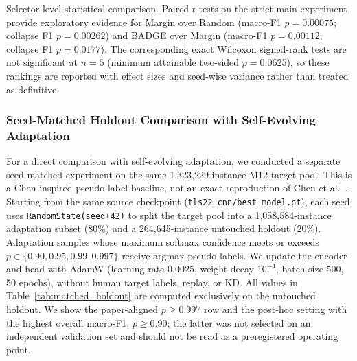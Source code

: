 \documentclass[journal]{IEEEtran}
\begin{document}
Selector-level statistical comparison.
\label{sec:significance}
Paired $t$-tests on the strict main experiment provide exploratory evidence for Margin over Random (macro-F1 $p{=}0.00075$; collapse F1 $p{=}0.00262$) and BADGE over Margin (macro-F1 $p{=}0.00112$; collapse F1 $p{=}0.0177$).
The corresponding exact Wilcoxon signed-rank tests are not significant at $n{=}5$ (minimum attainable two-sided $p{=}0.0625$), so these rankings are reported with effect sizes and seed-wise variance rather than treated as definitive.

\subsubsection{Seed-Matched Holdout Comparison with Self-Evolving Adaptation}
\label{sec:matched_holdout}

For a direct comparison with self-evolving adaptation, we conducted a separate seed-matched experiment on the same 1{,}323{,}229-instance M12 target pool. This is a Chen-inspired pseudo-label baseline, not an exact reproduction of Chen et al.~\cite{chen2025selfevolving}.
Starting from the same source checkpoint (\texttt{tls22\_cnn/best\_model.pt}), each seed uses \texttt{RandomState(seed+42)} to split the target pool into a 1{,}058{,}584-instance adaptation subset (80\%) and a 264{,}645-instance untouched holdout (20\%). Adaptation samples whose maximum softmax confidence meets or exceeds $p\in\{0.90,0.95,0.99,0.997\}$ receive argmax pseudo-labels. We update the encoder and head with AdamW (learning rate 0.0025, weight decay $10^{-4}$, batch size 500, 50 epochs), without human target labels, replay, or KD.
All values in Table~\ref{tab:matched_holdout} are computed exclusively on the untouched holdout. We show the paper-aligned $p{\geq}0.997$ row and the post-hoc setting with the highest overall macro-F1, $p{\geq}0.90$; the latter was not selected on an independent validation set and should not be read as a preregistered operating point.
\end{document}
